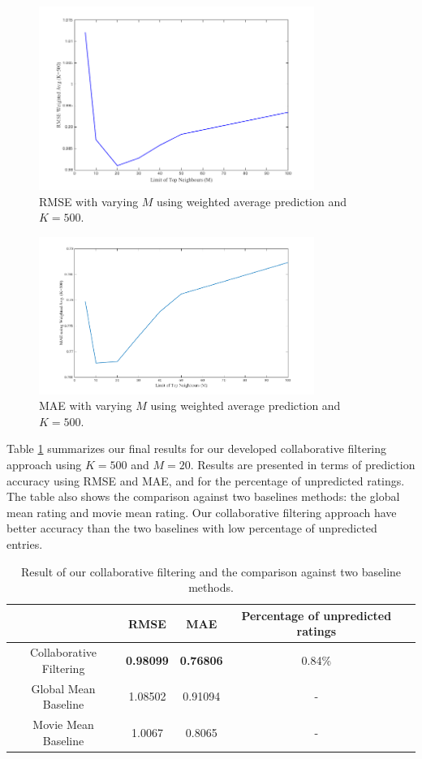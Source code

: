 \begin{figure}[!ht]
  \centering \includegraphics[width=0.8\textwidth]{images/rmsem.png}
  \caption{RMSE with varying $M$ using weighted average prediction and $K=500$.}
  \label{fig:rmsem}
\end{figure}

\begin{figure}[!ht]
  \centering \includegraphics[width=0.8\textwidth]{images/MAEm.png}
  \caption{MAE with varying $M$ using weighted average prediction and $K=500$.}
  \label{fig:maem}
\end{figure}

Table \ref{tab:finres} summarizes our final results for our developed
collaborative filtering approach using $K=500$ and $M=20$. Results are
presented in terms of prediction accuracy using RMSE and MAE, and for
the percentage of unpredicted ratings. The table also shows the
comparison against two baselines methods: the global mean rating and
movie mean rating. Our collaborative filtering approach have better
accuracy than the two baselines with low percentage of unpredicted
entries.

\begin{table}[!ht]
  \centering
  \begin{tabular}{|c|c|c|c|c|}
    \hline & RMSE & MAE & Percentage of unpredicted ratings \\ \hline
    Collaborative Filtering & \textbf{0.98099} & \textbf{0.76806} &
    0.84\%\\ \hline Global Mean Baseline & 1.08502 & 0.91094 & -
    \\ \hline Movie Mean Baseline & 1.0067 & 0.8065 & - \\ \hline
  \end{tabular}
  \caption{Result of our collaborative filtering and the comparison
    against two baseline methods.}
  \label{tab:finres}
\end{table}


